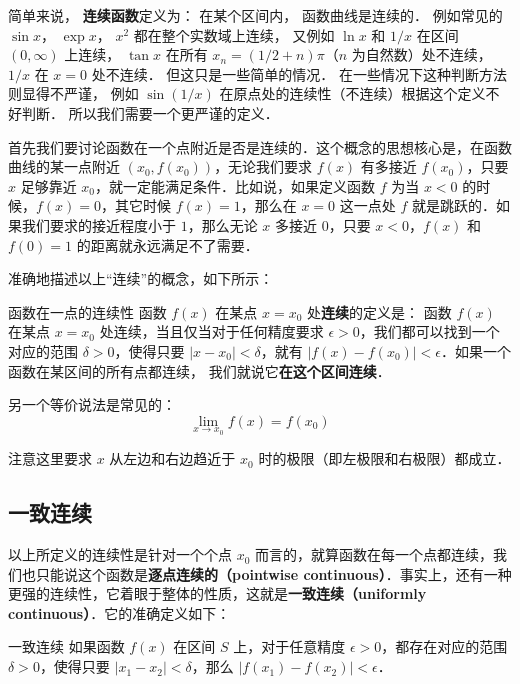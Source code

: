 

简单来说， \textbf{连续函数}定义为： 在某个区间内， 函数曲线是连续的． 例如常见的 $\sin x$， $\exp x$， $x^2$ 都在整个实数域上连续， 又例如 $\ln x$ 和 $1/x$ 在区间 $(0, \infty)$ 上连续， $\tan x$ 在所有 $x_n = (1/2 + n)\pi$（$n$ 为自然数）处不连续， $1/x$ 在 $x = 0$ 处不连续． 但这只是一些简单的情况． 在一些情况下这种判断方法则显得不严谨， 例如 $\sin(1/x)$ 在原点处的连续性（不连续）根据这个定义不好判断． 所以我们需要一个更严谨的定义．

首先我们要讨论函数在一个点附近是否是连续的．这个概念的思想核心是，在函数曲线的某一点附近 $(x_0, f(x_0))$，无论我们要求 $f(x)$ 有多接近 $f(x_0)$，只要 $x$ 足够靠近 $x_0$，就一定能满足条件．比如说，如果定义函数 $f$ 为当 $x<0$ 的时候，$f(x)=0$，其它时候 $f(x)=1$，那么在 $x=0$ 这一点处 $f$ 就是跳跃的．如果我们要求的接近程度小于 $1$，那么无论 $x$ 多接近 $0$，只要 $x<0$，$f(x)$ 和 $f(0)=1$ 的距离就永远满足不了需要．

准确地描述以上“连续”的概念，如下所示：

\begin{definition}{函数在一点的连续性}
函数 $f(x)$ 在某点 $x = x_0$ 处\textbf{连续}的定义是： 函数 $f(x)$ 在某点 $x=x_0$ 处连续，当且仅当对于任何精度要求 $\epsilon>0$，我们都可以找到一个对应的范围 $\delta>0$，使得只要 $|x-x_0|<\delta$，就有 $|f(x)-f(x_0)|<\epsilon$．如果一个函数在某区间的所有点都连续， 我们就说它\textbf{在这个区间连续}．

另一个等价说法是常见的：
\begin{equation}
\lim_{x \to x_0} f(x) = f(x_0)
\end{equation}
\end{definition}

注意这里要求 $x$ 从左边和右边趋近于 $x_0$ 时的极限（即左极限和右极限）都成立． %

\subsection{一致连续}

以上所定义的连续性是针对一个个点 $x_0$ 而言的，就算函数在每一个点都连续，我们也只能说这个函数是\textbf{逐点连续的（pointwise continuous）}．事实上，还有一种更强的连续性，它着眼于整体的性质，这就是\textbf{一致连续（uniformly continuous）}．它的准确定义如下：

\begin{definition}{一致连续}
如果函数 $f(x)$ 在区间 $S$ 上，对于任意精度 $\epsilon>0$，都存在对应的范围 $\delta>0$，使得只要 $|x_1-x_2|<\delta$，那么 $|f(x_1)-f(x_2)|<\epsilon$．

\end{definition}

